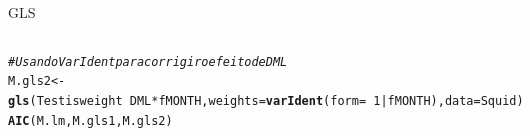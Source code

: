 \documentclass{beamer}\usepackage[]{graphicx}\usepackage[]{color}
\makeatletter
\newcommand{\hlnum}[1]{\textcolor[rgb]{0.686,0.059,0.569}{#1}}%
\newcommand{\hlcom}[1]{\textcolor[rgb]{0.678,0.584,0.686}{\textit{#1}}}%
\newcommand{\hlopt}[1]{\textcolor[rgb]{0,0,0}{#1}}%
\newcommand{\hlstd}[1]{\textcolor[rgb]{0.345,0.345,0.345}{#1}}%
\newcommand{\hlkwb}[1]{\textcolor[rgb]{0.69,0.353,0.396}{#1}}%
\newcommand{\hlkwc}[1]{\textcolor[rgb]{0.333,0.667,0.333}{#1}}%
\newcommand{\hlkwd}[1]{\textcolor[rgb]{0.737,0.353,0.396}{\textbf{#1}}}%
\newenvironment{kframe}{%
 \def\at@end@of@kframe{}%
 \ifinner\ifhmode%
  \def\at@end@of@kframe{\end{minipage}}%
  \begin{minipage}{\columnwidth}%
 \fi\fi%
 \def\FrameCommand##1{\hskip\@totalleftmargin \hskip-\fboxsep
 \colorbox{shadecolor}{##1}\hskip-\fboxsep
     \hskip-\linewidth \hskip-\@totalleftmargin \hskip\columnwidth}%
 \MakeFramed {\advance\hsize-\width
   \@totalleftmargin\z@ \linewidth\hsize
   \@setminipage}}%
 {\par\unskip\endMakeFramed%
 \at@end@of@kframe}
\newenvironment{knitrout}{}{} %
\renewenvironment{knitrout}{\setlength{\topsep}{0mm}}{}
\makeatother
\begin{document}
\begin{frame}[fragile]{GLS}

\begin{columns}[c]

\setlength{\topsep}{2pt}
\begin{knitrout}\tiny
{}\color{fgcolor}\begin{kframe}
\begin{alltt}
\hlcom{# Usando VarIdent para corrigir o efeito de DML}
\hlstd{M.gls2} \hlkwb{<-} \hlkwd{gls}\hlstd{(Testisweight} \hlopt{~} \hlstd{DML}\hlopt{*}\hlstd{fMONTH,} \hlkwc{weights}\hlstd{=}\hlkwd{varIdent}\hlstd{(}\hlkwc{form}\hlstd{=} \hlopt{~} \hlnum{1}\hlopt{|}\hlstd{fMONTH),} \hlkwc{data} \hlstd{=Squid)}
\hlkwd{AIC}\hlstd{(M.lm,M.gls1,M.gls2)}
\end{alltt}
\begin{verbatim}
##        df      AIC
## M.lm   25 3752.084
## M.gls1 25 3620.898
## M.gls2 36 3614.436
\end{verbatim}
\end{kframe}
\end{knitrout}

\begin{knitrout}
\color{fgcolor}
\includegraphics[width=0.7\linewidth]{figure/glsp3-1} 


\end{knitrout}
\end{columns}
\end{frame}
\end{document}
